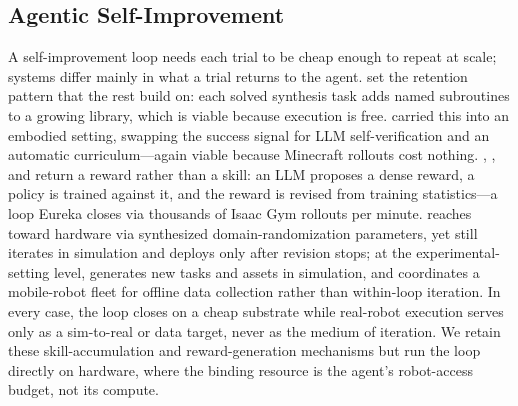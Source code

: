 

\subsection{Agentic Self-Improvement}\label{sec:related-selfimprove}
A self-improvement loop needs each trial to be cheap enough to repeat at scale; systems differ mainly in what a trial returns to the agent. \citet{ellis2021dreamcoder} set the retention pattern that the rest build on: each solved synthesis task adds named subroutines to a growing library, which is viable because execution is free. \citet{wang2023voyager} carried this into an embodied setting, swapping the success signal for LLM self-verification and an automatic curriculum---again viable because Minecraft rollouts cost nothing. \citet{yu2023language}, \citet{ma2024eureka}, and \citet{xie2024text2reward} return a reward rather than a skill: an LLM proposes a dense reward, a policy is trained against it, and the reward is revised from training statistics---a loop Eureka closes via thousands of Isaac Gym rollouts per minute. \citet{ma2024dreureka} reaches toward hardware via synthesized domain-randomization parameters, yet still iterates in simulation and deploys only after revision stops; at the experimental-setting level, \citet{wang2023robogen} generates new tasks and assets in simulation, and \citet{ahn2024autort} coordinates a mobile-robot fleet for offline data collection rather than within-loop iteration. In every case, the loop closes on a cheap substrate while real-robot execution serves only as a sim-to-real or data target, never as the medium of iteration. We retain these skill-accumulation and reward-generation mechanisms but run the loop directly on hardware, where the binding resource is the agent's robot-access budget, not its compute.



